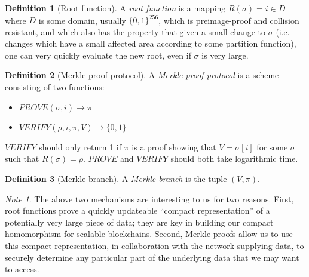 \documentclass[11pt,a4paper]{article}
\makeatletter
\theoremstyle{plain}
\theoremstyle{definition}
\newtheorem{defn}{Definition}[section]
\theoremstyle{remark}
\newtheorem*{note}{Note}
\newcommand{\ie}{i.e.\@\xspace}
\makeatother
\begin{document}
\begin{defn}[Root function]
A \emph{root function} is a mapping $R(\sigma) = i \in D$ where $D$ is some domain, usually $\{0,1\}^{256}$, which is preimage-proof and collision resistant, and which also has the property that given a small change to $\sigma$ (\ie changes which have a small affected area according to some partition function), one can very quickly evaluate the new root, even if $\sigma$ is very large.
\end{defn}

\begin{defn}[Merkle proof protocol]
A \emph{Merkle proof protocol} is a scheme consisting of two functions:
\begin{itemize}
\item
$PROVE(\sigma, i) \rightarrow \pi$
\item
$VERIFY(\rho, i, \pi, V) \rightarrow \{0, 1\}$
\end{itemize}
$VERIFY$ should only return 1 if $\pi$ is a proof showing that $V = \sigma[i]$ for some $\sigma$ such that $R(\sigma) = \rho$. $PROVE$ and $VERIFY$ should both take logarithmic time.
\end{defn}

\begin{defn}[Merkle branch]
A \emph{Merkle branch} is the tuple $(V, \pi)$.
\end{defn}

\begin{note}
The above two mechanisms are interesting to us for two reasons. First, root functions prove a quickly updateable ``compact representation'' of a potentially very large piece of data; they are key in building our compact homomorphism for scalable blockchains. Second, Merkle proofs allow us to use this compact representation, in collaboration with the network supplying data, to securely determine any particular part of the underlying data that we may want to access.
\end{note}
\end{document}
